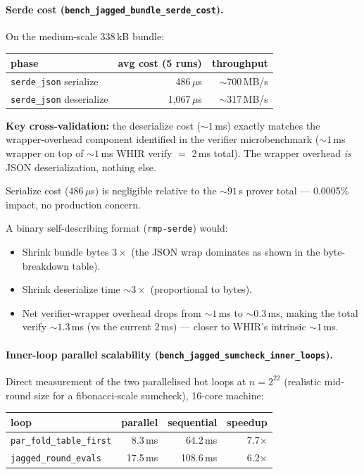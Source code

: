 \paragraph{Serde cost (\texttt{bench\_jagged\_bundle\_serde\_cost}).}
On the medium-scale 338\,kB bundle:

\begin{tabular}{lrr}
\toprule
\textbf{phase}        & \textbf{avg cost (5 runs)} & \textbf{throughput} \\
\midrule
\texttt{serde\_json} serialize   &   486\,$\mu$s & $\sim$700\,MB/s \\
\texttt{serde\_json} deserialize & 1{,}067\,$\mu$s & $\sim$317\,MB/s \\
\bottomrule
\end{tabular}

\textbf{Key cross-validation:} the deserialize cost ($\sim 1$\,ms)
exactly matches the wrapper-overhead component identified in the
verifier microbenchmark ($\sim 1$\,ms wrapper on top of $\sim 1$\,ms
WHIR verify $=$ 2\,ms total).  The wrapper overhead \emph{is} JSON
deserialization, nothing else.

Serialize cost ($486\,\mu$s) is negligible relative to the $\sim 91$\,s
prover total --- 0.0005\% impact, no production concern.

A binary self-describing format (\texttt{rmp-serde}) would:
\begin{itemize}
  \item Shrink bundle bytes $3\times$ (the JSON wrap dominates as
        shown in the byte-breakdown table).
  \item Shrink deserialize time $\sim 3\times$ (proportional to bytes).
  \item Net verifier-wrapper overhead drops from $\sim 1$\,ms to
        $\sim 0.3$\,ms, making the total verify $\sim 1.3$\,ms (vs the
        current 2\,ms) --- closer to WHIR's intrinsic $\sim 1$\,ms.
\end{itemize}

\paragraph{Inner-loop parallel scalability
(\texttt{bench\_jagged\_sumcheck\_inner\_loops}).}
Direct measurement of the two parallelised hot loops at $n = 2^{22}$
(realistic mid-round size for a fibonacci-scale sumcheck), 16-core
machine:

\begin{tabular}{lrrr}
\toprule
\textbf{loop}                        & \textbf{parallel} & \textbf{sequential} & \textbf{speedup} \\
\midrule
\texttt{par\_fold\_table\_first}     & 8.3\,ms  & 64.2\,ms  & 7.7$\times$ \\
\texttt{jagged\_round\_evals}        & 17.5\,ms & 108.6\,ms & 6.2$\times$ \\
\bottomrule
\end{tabular}

